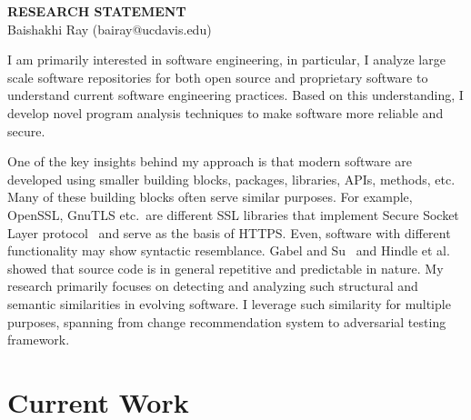 \documentclass[a4paper, 11pt]{article}
\begin{document}
\thispagestyle{fancy}
\lhead{}
\rhead{}


\pagestyle{fancy}
\rhead{\grayline{\thepage/\totalpages{}}}

\begin{small}

\begin{center}
{\large \bf RESEARCH STATEMENT}\\
\vspace*{0.1cm}
{\normalsize Baishakhi Ray (bairay@ucdavis.edu)}
\end{center}


I am primarily interested in software engineering, in particular, I analyze large scale software repositories 
for both open source and proprietary software to understand current software engineering practices. 
Based on this understanding, I develop novel program analysis techniques to make software more reliable and
 secure.

One of the key insights behind my approach is that modern software are developed using 
smaller building blocks, \eg  packages, libraries, APIs, methods, etc. 
Many of these building blocks often serve similar purposes. For example, OpenSSL, GnuTLS etc.~are 
different SSL libraries that implement Secure Socket Layer protocol~\cite{rfc5280} and serve as
the basis of HTTPS. Even, software with different functionality may show syntactic resemblance. 
Gabel and Su~\cite{Gabel2010:uniqueness} and Hindle et al.\cite{Hindle:2012} showed that source code 
is in general repetitive and predictable in nature. My research primarily focuses on detecting and analyzing 
such structural and semantic similarities in evolving software. I leverage such similarity for 
multiple purposes, spanning from change recommendation system to adversarial testing framework.

\section*{\small Current Work}


\end{small}
\end{document}
